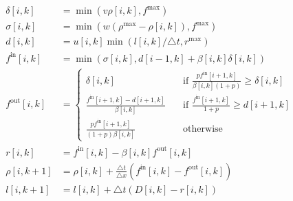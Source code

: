 \begin{align}
	\delta\left[i,k\right] & = \min\left(v \rho\left[i,k\right], f^{\max} \right) \label{eq:first-discrete}\\
	\sigma\left[i,k\right] & = \min\left(w\left(\rho^{\max} - \rho\left[i,k\right]\right), f^{\max}\right) \\
	d\left[i,k\right] & = u\left[i,k\right]\min \left(l\left[i,k\right] / \triangle t, r^{\max}\right) \label{eq:onramp-demand} \\
	f^{\text{in}}\left[i,k\right] & = \min\left(\sigma\left[i,k\right], d\left[i-1,k\right] + \beta\left[i,k\right] \delta\left[i,k\right]\right) \\
	f^{\text{out}}\left[i,k\right] & = 
	\begin{cases}
	\delta\left[i,k\right] & \quad \mbox{if } \frac{p f^{\text{in}}\left[i+1,k\right] }{\beta\left[i,k\right] \left(1 + p\right)} \ge \delta\left[i,k\right] \\
	\frac{f^{\text{in}}\left[i+1,k\right] - d\left[i+1,k\right]}{\beta\left[i,k\right]} & \quad \mbox{if } \frac{f^{\text{in}}[i+1,k]}{1 + p} \ge d\left[i+1,k\right] \\
	\frac{p f^{\text{in}}\left[i+1,k\right]}{\left(1 + p\right) \beta\left[i,k\right]} & \quad \mbox{otherwise}
	\end{cases} \\
	r\left[i,k\right] & = f^{\text{in}}\left[i,k\right] - \beta\left[i,k\right] f^{\text{out}}\left[i,k\right] \label{eq:last-intermediate}\\
	\rho\left[i,k+1\right] & = \rho\left[i,k\right] + \frac{\triangle t}{\triangle x} \left(f^{\text{in}}\left[i,k\right] - f^{\text{out}}\left[i,k\right]\right) \label{eq:first-explicit}\\
	l\left[i,k+1\right] & = l\left[i,k\right] + \triangle t \left(D\left[i,k\right] - r\left[i,k\right]\right) \label{eq:last-discrete}
\end{align}
